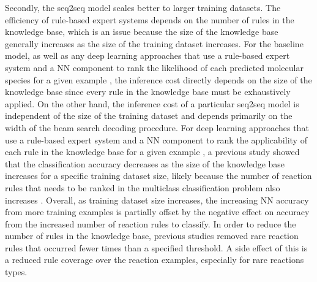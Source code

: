 Secondly, the seq2seq model scales better to larger training datasets. The efficiency of rule-based expert systems depends on the number of rules in the knowledge base, which is an issue because the size of the knowledge base generally increases as the size of the training dataset increases. For the baseline model, as well as any deep learning approaches that use a rule-based expert system and a NN component to rank the likelihood of each predicted molecular species for a given example \cite{coley2017prediction}, the inference cost directly depends on the size of the knowledge base since every rule in the knowledge base must be exhaustively applied. On the other hand, the inference cost of a particular seq2seq model is independent of the size of the training dataset and depends primarily on the width of the beam search decoding procedure. For deep learning approaches that use a rule-based expert system and a NN component to rank the applicability of each rule in the knowledge base for a given example \cite{segler2017neural, wei2016neural}, a previous study showed that the classification accuracy decreases as the size of the knowledge base increases for a specific training dataset size, likely because the number of reaction rules that needs to be ranked in the multiclass classification problem also increases \cite{segler2017neural}. Overall, as training dataset size increases, the increasing NN accuracy from more training examples is partially offset by the negative effect on accuracy from the increased number of reaction rules to classify. In order to reduce the number of rules in the knowledge base, previous studies \cite{segler2017neural, coley2017prediction} removed rare reaction rules that occurred fewer times than a specified threshold. A side effect of this is a reduced rule coverage over the reaction examples, especially for rare reactions types. 

